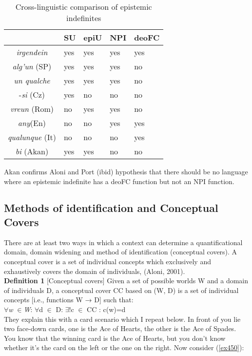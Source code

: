 \documentclass[output=paper,
modfonts
]{langsci/langscibook}
\begin{document}
\begin{table}
\caption{Cross-linguistic comparison of epistemic indefinites}
	\begin{tabular}{|c | p{2cm} | p{2cm} | p{2cm}| p{2cm}| }
		\hline
		{}		& SU		& 	epiU & NPI & deoFC \\ \hline
		\emph{irgendein} 			& yes 		& 	yes	& 	yes	& 	yes	\\ \hline
		\emph{alg'un} (SP)        & yes 	 	& 	yes 	& 	yes & 	no		\\ \hline
		 \emph{un qualche} 		& yes 	 	& 	yes 	& 	yes & 	no \\		\hline
		-\emph{si} (Cz)	& 	yes	& 	no &	 no & no			\\ \hline
		\emph{vreun} (Rom) 		& no	 	& 	yes 	& 	yes & 	no \\		\hline	
		\emph{any}(En) 		& no 	 	& 	no 	& 	yes & 	yes \\		\hline	
		\emph{qualunque} (It)		& no	 	& 	no 	& 	no & 	yes \\		\hline
		\emph{bi} (Akan) 		& yes 	 	& 	yes 	& 	no & 	no \\		\hline
	\end{tabular}
    \end{table}
Akan confirms Aloni and Port (ibid) hypothesis that there should be no language where an epistemic indefinite has a deoFC function but not an NPI function. 

\subsection{Methods of identification and Conceptual Covers}
There are at least two ways in which a context can determine a quantificational domain, domain widening and method of identification (conceptual covers). 
A conceptual cover is a set of individual concepts which exclusively and exhaustively covers the domain of individuals, (Aloni, 2001).\\
\textbf{Definition 1} [Conceptual covers] Given a set of possible worlds W and a domain of individuals D, a conceptual cover CC based on (W, D) is a set of individual concepts [i.e., functions W → D] such that:\\

$\forall$\emph{w} $\in$\emph{W}: $\forall$d $\in$ D: $\exists$!c $\in$ CC : c(w)=d \\
They explain this with a card scenario which I repeat below.
 In front of you lie two face-down cards, one is the Ace of Hearts, the other is the Ace of Spades. You know that the winning card is the Ace of Hearts, but you don’t know whether it’s the card on the left or the one on the right. Now consider (\ref{ex450}):
\end{document}
